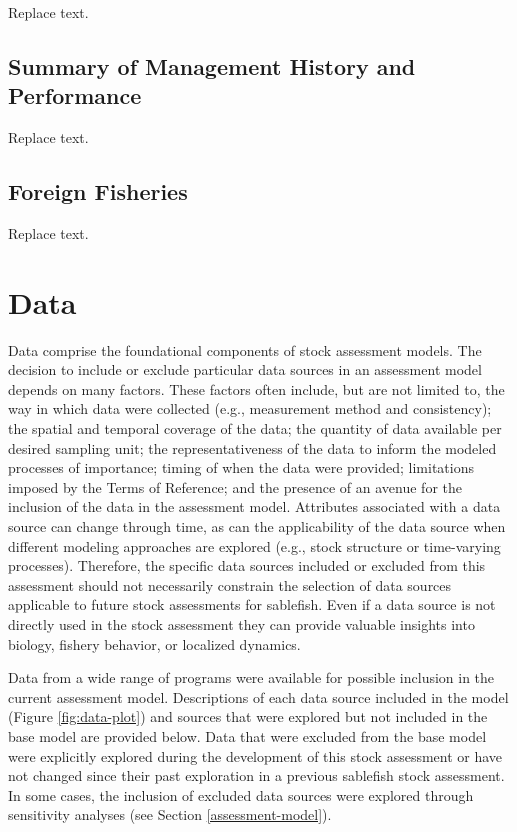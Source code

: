 \documentclass[11pt,
  letterpaper,
]{article}
\begin{document}
Replace text.

\hypertarget{summary-of-management-history-and-performance}{%
\subsection{Summary of Management History and Performance}\label{summary-of-management-history-and-performance}}

Replace text.

\hypertarget{foreign-fisheries}{%
\subsection{Foreign Fisheries}\label{foreign-fisheries}}

Replace text.

\hypertarget{data}{%
\section{Data}\label{data}}

Data comprise the foundational components of stock assessment models. The decision to include or exclude particular data sources in an assessment model depends on many factors. These factors often include, but are not limited to, the way in which data were collected (e.g., measurement method and consistency); the spatial and temporal coverage of the data; the quantity of data available per desired sampling unit; the representativeness of the data to inform the modeled processes of importance; timing of when the data were provided; limitations imposed by the Terms of Reference; and the presence of an avenue for the inclusion of the data in the assessment model. Attributes associated with a data source can change through time, as can the applicability of the data source when different modeling approaches are explored (e.g., stock structure or time-varying processes). Therefore, the specific data sources included or excluded from this assessment should not necessarily constrain the selection of data sources applicable to future stock assessments for sablefish. Even if a data source is not directly used in the stock assessment they can provide valuable insights into biology, fishery behavior, or localized dynamics.

Data from a wide range of programs were available for possible inclusion in the current assessment model. Descriptions of each data source included in the model (Figure \ref{fig:data-plot}) and sources that were explored but not included in the base model are provided below. Data that were excluded from the base model were explicitly explored during the development of this stock assessment or have not changed since their past exploration in a previous sablefish stock assessment. In some cases, the inclusion of excluded data sources were explored through sensitivity analyses (see Section \ref{assessment-model}).
\end{document}
